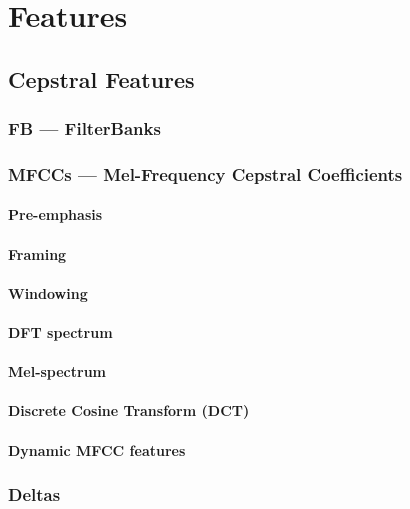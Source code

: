 \chapter{Features}
\section{Cepstral Features}
\subsection{FB --- FilterBanks}
\subsection{MFCCs --- Mel-Frequency Cepstral Coefficients}

\subsubsection{Pre-emphasis}
\subsubsection{Framing}
\subsubsection{Windowing}
\subsubsection{DFT spectrum}
\subsubsection{Mel-spectrum}
\subsubsection{Discrete Cosine Transform (DCT)}
\subsubsection{Dynamic MFCC features}


\subsection{Deltas}
